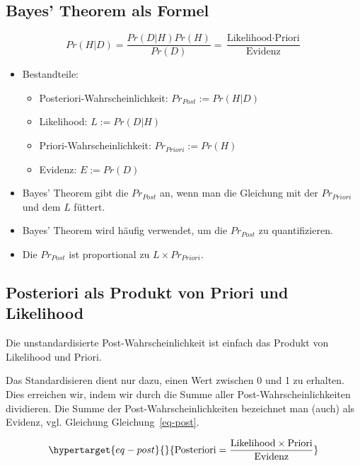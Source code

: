 \documentclass[
  a4paper,
  DIV=11]{scrreprt}
\theoremstyle{definition}
\theoremstyle{remark}
\begin{document}
\hypertarget{bayes-theorem-als-formel}{%
\subsection{Bayes' Theorem als Formel}\label{bayes-theorem-als-formel}}

\[Pr(H|D) = \frac{Pr(D|H) Pr(H)}{Pr(D)} = \frac{\text{Likelihood}  \cdot \text{Priori}}{\text{Evidenz}}\]

\begin{itemize}
\item
  Bestandteile:

  \begin{itemize}
  \item
    Posteriori-Wahrscheinlichkeit: \(Pr_{Post} := Pr(H|D)\)
  \item
    Likelihood: \(L := Pr(D|H)\)
  \item
    Priori-Wahrscheinlichkeit: \(Pr_{Priori} := Pr(H)\)
  \item
    Evidenz: \(E := Pr(D)\)
  \end{itemize}
\item
  Bayes' Theorem gibt die \(Pr_{Post}\) an, wenn man die Gleichung mit
  der \(Pr_{Priori}\) und dem \(L\) füttert.
\item
  Bayes' Theorem wird häufig verwendet, um die \(Pr_{Post}\) zu
  quantifizieren.
\item
  Die \(Pr_{Post}\) ist proportional zu \(L \times Pr_{Priori}\).
\end{itemize}

\hypertarget{posteriori-als-produkt-von-priori-und-likelihood}{%
\subsection{Posteriori als Produkt von Priori und
Likelihood}\label{posteriori-als-produkt-von-priori-und-likelihood}}

Die unstandardisierte Post-Wahrscheinlichkeit ist einfach das Produkt
von Likelihood und Priori.

Das Standardisieren dient nur dazu, einen Wert zwischen 0 und 1 zu
erhalten. Dies erreichen wir, indem wir durch die Summe aller
Post-Wahrscheinlichkeiten dividieren. Die Summe der
Post-Wahrscheinlichkeiten bezeichnet man (auch) als Evidenz, vgl.
Gleichung Gleichung~\ref{eq-post}.

\begin{equation}\protect\hypertarget{eq-post}{}{\text{Posteriori} = \frac{\text{Likelihood} \times \text{Priori}}{\text{Evidenz}}}\label{eq-post}\end{equation}
\end{document}
